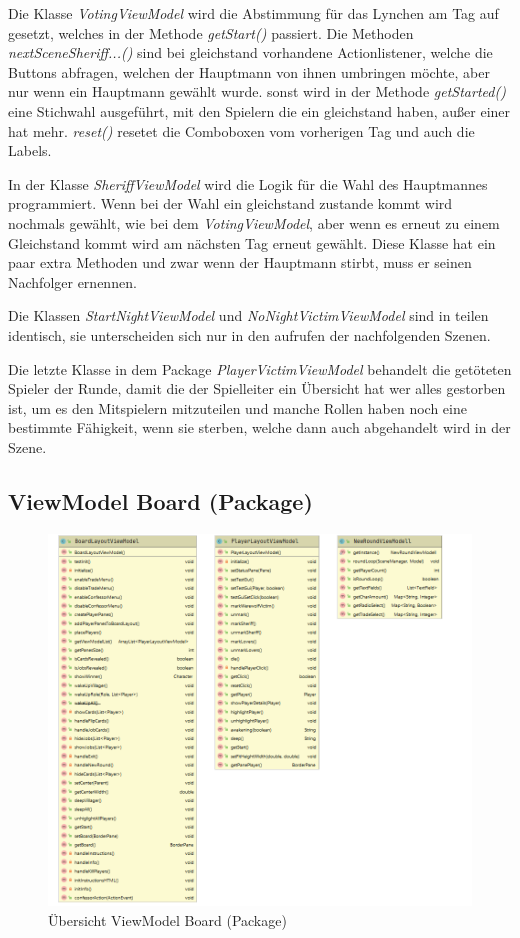 \medskip
Die Klasse \textit{VotingViewModel} wird die Abstimmung für das Lynchen am Tag auf gesetzt, welches in der Methode \textit{getStart()} passiert. Die Methoden \textit{nextSceneSheriff...()} sind bei gleichstand vorhandene Actionlistener, welche die Buttons abfragen, welchen der Hauptmann von ihnen umbringen möchte, aber nur wenn ein Hauptmann gewählt wurde. sonst wird in der Methode \textit{getStarted()} eine Stichwahl ausgeführt, mit den Spielern die ein gleichstand haben, außer einer hat mehr.
\textit{reset()} resetet die Comboboxen vom vorherigen Tag und auch die Labels.

\medskip
In der Klasse \textit{SheriffViewModel} wird die Logik für die Wahl des Hauptmannes programmiert. Wenn bei der Wahl ein gleichstand zustande kommt wird nochmals gewählt, wie bei dem \textit{VotingViewModel}, aber wenn es erneut zu einem Gleichstand kommt wird am nächsten Tag erneut gewählt. Diese Klasse hat ein paar extra Methoden und zwar wenn der Hauptmann stirbt, muss er seinen Nachfolger ernennen.

\medskip
Die Klassen \textit{StartNightViewModel} und \textit{NoNightVictimViewModel} sind in teilen identisch, sie unterscheiden sich nur in den aufrufen der nachfolgenden Szenen.

\medskip
Die letzte Klasse in dem Package \textit{PlayerVictimViewModel} behandelt die getöteten Spieler der Runde, damit die der Spielleiter ein Übersicht hat wer alles gestorben ist, um es den Mitspielern mitzuteilen und manche Rollen haben noch eine bestimmte Fähigkeit, wenn sie sterben, welche dann auch abgehandelt wird in der Szene.      

\subsection{ViewModel Board (Package)}

\begin{figure}[H]
	\centering
	\includegraphics[width=\textwidth]{architektur/View_Board_Uebersicht.png}
	\caption{Übersicht ViewModel Board (Package)}
	\label{figure:viewmodelboard(package)}
\end{figure}

